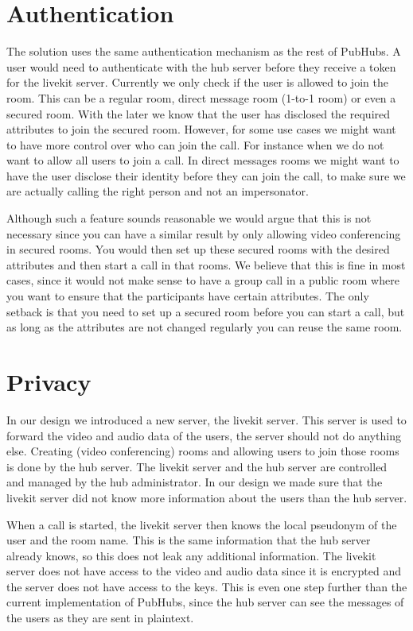\documentclass{report}
\begin{document}
\section{Authentication}
The solution uses the same authentication mechanism as the rest of PubHubs. A user would need to authenticate with the
hub server before they receive a token for the livekit server. Currently we only check if the user is allowed to
join the room. This can be a regular room, direct message room (1-to-1 room) or even a secured room. With the later we know that the user has
disclosed the required attributes to join the secured room. However, for some use cases we might want to have more
control over who can join the call. For instance when we do not want to allow all users to join a call. In direct
messages rooms we might want to have the user disclose their identity before they can join the call, to
make sure we are actually calling the right person and not an impersonator.

Although such a feature sounds reasonable we would argue that this is not necessary since you can have a similar
result by only allowing video conferencing in secured rooms. You would then set up these secured rooms with the
desired attributes and then start a call in that rooms. We believe that this is fine in most cases, since it would
not make sense to have a group call in a public room where you want to ensure that the participants have certain attributes.
The only setback is that you need to set up a secured room before you can start a call, but as long as the attributes
are not changed regularly you can reuse the same room.

\section{Privacy}
In our design we introduced a new server, the livekit server. This server is used to forward the video and audio data
of the users, the server should not do anything else. Creating (video conferencing) rooms and allowing users to join
those rooms is done by the hub server. The livekit server and the hub server are controlled and managed by the hub
administrator. In our design we made sure that the livekit server did not know more information about the users
than the hub server.

When a call is started, the livekit server then knows the local pseudonym of the user and the room name. This is the
same information that the hub server already knows, so this does not leak any additional information. The livekit server
does not have access to the video and audio data since it is encrypted and the server does not have access to the keys.
This is even one step further than the current implementation of PubHubs, since the hub server can see the messages of
the users as they are sent in plaintext.
\end{document}
